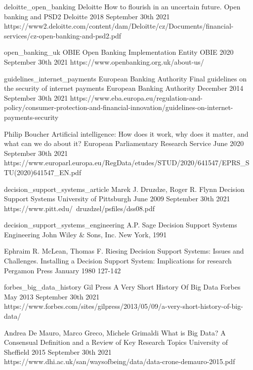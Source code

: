 \begin{thebibliography}{100}
\onlinebibitem
{deloitte_open_banking}
{Deloitte}
{How to flourish in an uncertain future. Open banking and PSD2}
{Deloitte}
{2018}
{September 30th 2021}
{https://www2.deloitte.com/content/dam/Deloitte/cz/Documents/financial-services/cz-open-banking-and-psd2.pdf}

\onlinebibitem
{open_banking_uk}
{OBIE}
{Open Banking Implementation Entity}
{OBIE}
{2020}
{September 30th 2021}
{https://www.openbanking.org.uk/about-us/}

\onlinebibitem
{guidelines_internet_payments}
{European Banking Authority}
{Final guidelines on the security of internet payments}
{European Banking Authority}
{December 2014}
{September 30th 2021}
{https://www.eba.europa.eu/regulation-and-policy/consumer-protection-and-financial-innovation/guidelines-on-internet-payments-security}

{Philip Boucher}
{Artificial intelligence: How does it work, why does it matter, and what can we do about it?}
{European Parliamentary Research Service}
{June 2020}
{September 30th 2021}
{https://www.europarl.europa.eu/RegData/etudes/STUD/2020/641547/EPRS\_STU(2020)641547\_EN.pdf}

\onlinebibitem
{decision_support_systems_article}
{Marek J. Druzdze, Roger R. Flynn}
{Decision Support Systems}
{University of Pittsburgh}
{June 2009}
{September 30th 2021}
{https://www.pitt.edu/~druzdzel/psfiles/dss08.pdf}

\offlinebibitem
{decision_support_systems_engineering}
{A.P. Sage}
{Decision Support Systems Engineering}
{John Wiley \& Sons, Inc.}
{New York, 1991}
{}

{Ephraim R. McLean, Thomas F. Riesing}
{Decision Support Systems: Issues and Challenges. Installing a Decision Support System: Implications for research}
{Pergamon Press}
{January 1980}
{127-142}

\onlinebibitem
{forbes_big_data_history}
{Gil Press}
{A Very Short History Of Big Data}
{Forbes}
{May 2013}
{September 30th 2021}
{https://www.forbes.com/sites/gilpress/2013/05/09/a-very-short-history-of-big-data/}

{Andrea De Mauro, Marco Greco, Michele Grimaldi}
{What is Big Data? A Consensual Definition and a Review of Key Research Topics}
{University of Sheffield}
{2015}
{September 30th 2021}
{https://www.dhi.ac.uk/san/waysofbeing/data/data-crone-demauro-2015.pdf}


\end{thebibliography}

